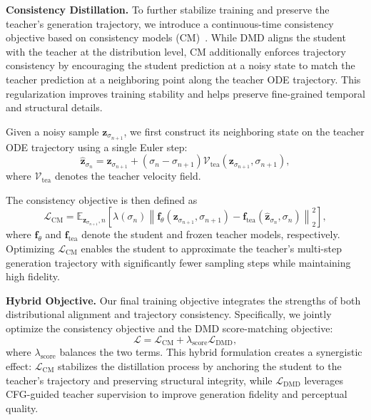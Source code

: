 \documentclass{llmxive}
\begin{document}
\textbf{Consistency Distillation.}
To further stabilize training and preserve the teacher's generation trajectory, we introduce a continuous-time consistency objective based on consistency models (CM)~\cite{song2023consistencymodels,lu2025simplifyingstabilizingscalingcontinuoustime,zheng2026largescalediffusiondistillation}. While DMD aligns the student with the teacher at the distribution level, CM additionally enforces trajectory consistency by encouraging the student prediction at a noisy state to match the teacher prediction at a neighboring point along the teacher ODE trajectory. This regularization improves training stability and helps preserve fine-grained temporal and structural details.

Given a noisy sample $\mathbf{z}_{\sigma_{n+1}}$, we first construct its neighboring state on the teacher ODE trajectory using a single Euler step:
\begin{equation}
\hat{\mathbf{z}}_{\sigma_n}
=
\mathbf{z}_{\sigma_{n+1}}
+
(\sigma_n-\sigma_{n+1})
\mathcal{V}_{\text{tea}}
(\mathbf{z}_{\sigma_{n+1}},\sigma_{n+1}),
\end{equation}
where $\mathcal{V}_{\text{tea}}$ denotes the teacher velocity field.

The consistency objective is then defined as
\begin{equation}
\mathcal{L}_{\text{CM}}
=
\mathbb{E}_{\mathbf{z}_{\sigma_{n+1}},n}
\left[
\lambda(\sigma_n)
\left\|
\mathbf{f}_{\theta}
(\mathbf{z}_{\sigma_{n+1}},\sigma_{n+1})
-
\mathbf{f}_{\text{tea}}
(\hat{\mathbf{z}}_{\sigma_n},\sigma_n)
\right\|_2^2
\right],
\end{equation}
where $\mathbf{f}_{\theta}$ and $\mathbf{f}_{\text{tea}}$ denote the student and frozen teacher models, respectively. Optimizing $\mathcal{L}_{\text{CM}}$ enables the student to approximate the teacher's multi-step generation trajectory with significantly fewer sampling steps while maintaining high fidelity.

\textbf{Hybrid Objective.}
Our final training objective integrates the strengths of both distributional alignment and trajectory consistency. Specifically, we jointly optimize the consistency objective and the DMD score-matching objective:
\begin{equation}
\mathcal{L}
=
\mathcal{L}_{\text{CM}}
+
\lambda_{\text{score}}
\mathcal{L}_{\text{DMD}},
\end{equation}
where $\lambda_{\text{score}}$ balances the two terms. This hybrid formulation creates a synergistic effect: $\mathcal{L}_{\text{CM}}$ stabilizes the distillation process by anchoring the student to the teacher's trajectory and preserving structural integrity, while $\mathcal{L}_{\text{DMD}}$ leverages CFG-guided teacher supervision to improve generation fidelity and perceptual quality.
\end{document}
